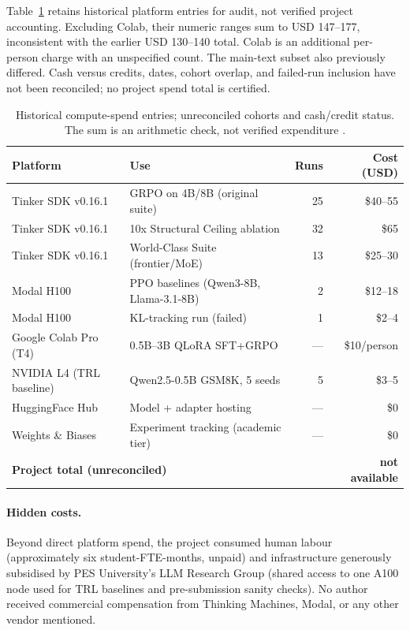 Table~\ref{tab:compute_spend} retains historical platform entries for audit,
not verified project accounting. Excluding Colab, their numeric ranges sum to
USD 147--177, inconsistent with the earlier USD 130--140 total. Colab is an
additional per-person charge with an unspecified count. The main-text subset
also previously differed. Cash versus credits, dates, cohort overlap, and
failed-run inclusion have not been reconciled; no project spend total is certified.

\begin{table}[ht]
\centering
\small
\caption{Historical compute-spend entries; unreconciled cohorts and cash/credit status.
The sum is an arithmetic check, not verified expenditure \cite{henderson2018deep}.}
\label{tab:compute_spend}
\begin{tabular}{llrr}
\toprule
\textbf{Platform} & \textbf{Use} & \textbf{Runs} & \textbf{Cost (USD)} \\
\midrule
Tinker SDK v0.16.1 & GRPO on 4B/8B (original suite)        & 25 & \$40--55 \\
Tinker SDK v0.16.1 & 10x Structural Ceiling ablation       & 32 & \$65 \\
Tinker SDK v0.16.1 & World-Class Suite (frontier/MoE)      & 13 & \$25--30 \\
Modal H100         & PPO baselines (Qwen3-8B, Llama-3.1-8B)& 2  & \$12--18 \\
Modal H100         & KL-tracking run (failed)              & 1  & \$2--4   \\
Google Colab Pro (T4) & 0.5B--3B QLoRA SFT+GRPO            & --- & \$10/person \\
NVIDIA L4 (TRL baseline)& Qwen2.5-0.5B GSM8K, 5 seeds      & 5  & \$3--5   \\
HuggingFace Hub    & Model + adapter hosting               & --- & \$0 \\
Weights \& Biases  & Experiment tracking (academic tier)   & --- & \$0 \\
\midrule
\multicolumn{3}{l}{\textbf{Project total (unreconciled)}} & \textbf{not available} \\
\bottomrule
\end{tabular}
\end{table}

\paragraph{Hidden costs.} Beyond direct platform spend, the project
consumed human labour (approximately six student-FTE-months, unpaid) and
infrastructure generously subsidised by PES University's LLM Research
Group (shared access to one A100 node used for TRL baselines and
pre-submission sanity checks). No author received commercial compensation
from Thinking Machines, Modal, or any other vendor mentioned.

